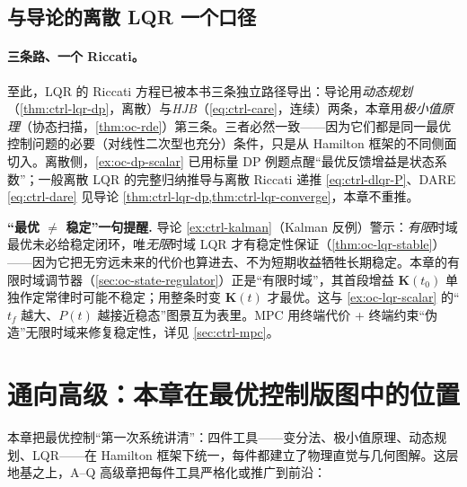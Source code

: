 \subsection{与导论的离散 LQR 一个口径}
\label{sec:oc-lqr-discrete-preview}

\paragraph{三条路、一个 Riccati。}
至此，LQR 的 Riccati 方程已被本书三条独立路径导出：导论用\emph{动态规划}（\cref{thm:ctrl-lqr-dp}，离散）与\emph{HJB}（\cref{eq:ctrl-care}，连续）两条，本章用\emph{极小值原理}（协态扫描，\cref{thm:oc-rde}）第三条。三者必然一致——因为它们都是同一最优控制问题的必要（对线性二次型也充分）条件，只是从 Hamilton 框架的不同侧面切入。离散侧，\cref{ex:oc-dp-scalar} 已用标量 DP 例题点醒“最优反馈增益是状态系数”；一般离散 LQR 的完整归纳推导与离散 Riccati 递推 \cref{eq:ctrl-dlqr-P}、DARE \cref{eq:ctrl-dare} 见导论 \cref{thm:ctrl-lqr-dp,thm:ctrl-lqr-converge}，本章不重推。

\begin{note}
\textbf{“最优 $\ne$ 稳定”一句提醒.}\; 导论 \cref{ex:ctrl-kalman}（Kalman 反例）警示：\emph{有限}时域最优未必给稳定闭环，唯\emph{无限}时域 LQR 才有稳定性保证（\cref{thm:oc-lqr-stable}）——因为它把无穷远未来的代价也算进去、不为短期收益牺牲长期稳定。本章的有限时域调节器（\cref{sec:oc-state-regulator}）正是“有限时域”，其首段增益 $\mathbf K(t_0)$ 单独作定常律时可能不稳定；用整条时变 $\mathbf K(t)$ 才最优。这与 \cref{ex:oc-lqr-scalar} 的“$t_f$ 越大、$P(t)$ 越接近稳态”图景互为表里。MPC 用终端代价 + 终端约束“伪造”无限时域来修复稳定性，详见 \cref{sec:ctrl-mpc}。
\end{note}

\section{通向高级：本章在最优控制版图中的位置}
\label{sec:oc-outlook}

本章把最优控制“第一次系统讲清”：四件工具——变分法、极小值原理、动态规划、LQR——在 Hamilton 框架下统一，每件都建立了物理直觉与几何图解。这层地基之上，A--Q 高级章把每件工具严格化或推广到前沿：

